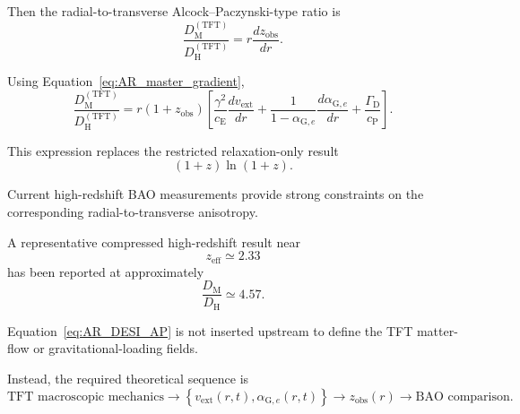 Then the radial-to-transverse Alcock--Paczynski-type ratio is
\begin{equation}
    \frac{
        D_{\mathrm M}^{(\mathrm{TFT})}
    }{
        D_{\mathrm H}^{(\mathrm{TFT})}
    }
    =
    r
    \frac{
        dz_{\mathrm{obs}}
    }{
        dr
    }.
    \label{eq:AR_AP_def}
\end{equation}

Using Equation~\eqref{eq:AR_master_gradient},
\begin{equation}
    \boxed{
    \frac{
        D_{\mathrm M}^{(\mathrm{TFT})}
    }{
        D_{\mathrm H}^{(\mathrm{TFT})}
    }
    =
    r
    (1+z_{\mathrm{obs}})
    \left[
        \frac{
            \gamma^2
        }{
            c_{\mathrm E}
        }
        \frac{
            dv_{\mathrm{ext}}
        }{
            dr
        }
        +
        \frac{1}{
            1-\alpha_{\mathrm G,e}
        }
        \frac{
            d\alpha_{\mathrm G,e}
        }{
            dr
        }
        +
        \frac{
            \Gamma_{\mathrm D}
        }{
            c_{\mathrm P}
        }
    \right].
    }
    \label{eq:AR_AP_master}
\end{equation}

This expression replaces the restricted relaxation-only result
\begin{equation}
    (1+z)\ln(1+z).
\end{equation}

Current high-redshift BAO measurements provide strong constraints on the
corresponding radial-to-transverse anisotropy.

A representative compressed high-redshift result near
\begin{equation}
    z_{\mathrm{eff}}
    \simeq
    2.33
\end{equation}
has been reported at approximately
\begin{equation}
    \frac{
        D_{\mathrm M}
    }{
        D_{\mathrm H}
    }
    \simeq
    4.57.
    \label{eq:AR_DESI_AP}
\end{equation}

Equation~\eqref{eq:AR_DESI_AP} is not inserted upstream to define the TFT
matter-flow or gravitational-loading fields.

Instead, the required theoretical sequence is
\begin{equation}
    \boxed{
    \text{TFT macroscopic mechanics}
    \rightarrow
    \left\{
        v_{\mathrm{ext}}(r,t),
        \alpha_{\mathrm G,e}(r,t)
    \right\}
    \rightarrow
    z_{\mathrm{obs}}(r)
    \rightarrow
    \text{BAO comparison}.
    }
    \label{eq:AR_BAO_logic}
\end{equation}

